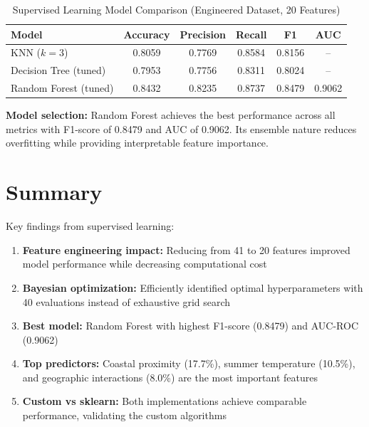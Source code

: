 \begin{table}[H]
\centering
\caption{Supervised Learning Model Comparison (Engineered Dataset, 20 Features)}
\label{tab:model_comparison}
\begin{tabular}{|l|c|c|c|c|c|}
\hline
\textbf{Model} & \textbf{Accuracy} & \textbf{Precision} & \textbf{Recall} & \textbf{F1} & \textbf{AUC} \\
\hline
KNN ($k=3$) & 0.8059 & 0.7769 & 0.8584 & 0.8156 & -- \\
Decision Tree (tuned) & 0.7953 & 0.7756 & 0.8311 & 0.8024 & -- \\
Random Forest (tuned) & 0.8432 & 0.8235 & 0.8737 & 0.8479 & 0.9062 \\
\hline
\end{tabular}
\end{table}

\begin{table}[H]
\centering
\caption{Hyperparameter Configuration Summary}
\label{tab:hyperparameter_summary}
\end{table}

\textbf{Model selection:} Random Forest achieves the best performance across all metrics with F1-score of 0.8479 and AUC of 0.9062. Its ensemble nature reduces overfitting while providing interpretable feature importance.

\section{Summary}
Key findings from supervised learning:
\begin{enumerate}
    \item \textbf{Feature engineering impact:} Reducing from 41 to 20 features improved model performance while decreasing computational cost
    \item \textbf{Bayesian optimization:} Efficiently identified optimal hyperparameters with 40 evaluations instead of exhaustive grid search
    \item \textbf{Best model:} Random Forest with highest F1-score (0.8479) and AUC-ROC (0.9062)
    \item \textbf{Top predictors:} Coastal proximity (17.7\%), summer temperature (10.5\%), and geographic interactions (8.0\%) are the most important features
    \item \textbf{Custom vs sklearn:} Both implementations achieve comparable performance, validating the custom algorithms
\end{enumerate}

